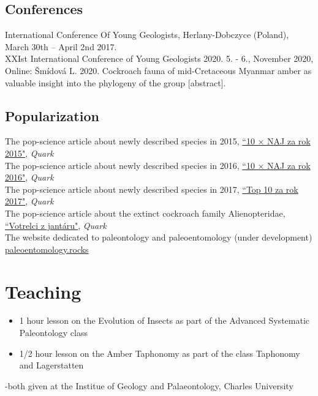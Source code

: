 \documentclass[11pt]{article} %
\begin{document}
\subsection*{Conferences}

 International Conference Of Young Geologists, Herlany-Dobczyce (Poland), March 30th – April 2nd 2017.\\
 XXIst International Conference of Young Geologists 2020. 5. - 6., November 2020, Online:
Šmídová L. 2020. Cockroach fauna of mid-Cretaceous Myanmar amber as valuable insight into the phylogeny of the group [abstract].




\subsection*{Popularization}

 The pop-science article about newly described species in 2015, \href{https://www.quark.sk/10-x-naj-za-rok-2015/}{“10 × NAJ za rok 2015"}, \emph{Quark}\\
  The pop-science article about newly described species in 2016, \href{https://www.quark.sk/10-x-naj-za-rok-2016/}{“10 × NAJ za rok 2016"}, \emph{Quark}\\
  The pop-science article about newly described species in 2017, \href{https://www.quark.sk/top-10-za-rok-2017/}{“Top 10 za rok 2017"}, \emph{Quark}\\
  The pop-science article about the extinct cockroach family Alienopteridae, \href{https://www.quark.sk/votrelci-z-jantaru/}{“Votrelci z jantáru"}, \emph{Quark}\\
  The website dedicated to paleontology and paleoentomology (under development) \href{https://paleoentomology.rocks/}{paleoentomology.rocks}


\section*{Teaching}
\begin{itemize}
\itemsep -0.5em
\item 1 hour lesson on the Evolution of Insects as part of the Advanced Systematic Paleontology class  
 \item1/2 hour lesson on the Amber Taphonomy as part of the class Taphonomy and Lagerstatten 
\end{itemize}
-both given at the Institue of Geology and Palaeontology, Charles University
\end{document}
